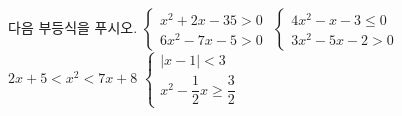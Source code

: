 다음 부등식을 푸시오.
 $\begin{cases} x^2+2x-35>0 \\ 6x^2-7x-5>0 \end{cases}$
 $\begin{cases} 4x^2-x-3\le 0 \\ 3x^2-5x-2>0 \end{cases}$
 $2x+5<x^2<7x+8$
 $\begin{cases} |x-1|<3 \\[4pt] x^2-\dfrac{1}{2}x\ge \dfrac{3}{2} \end{cases}$
